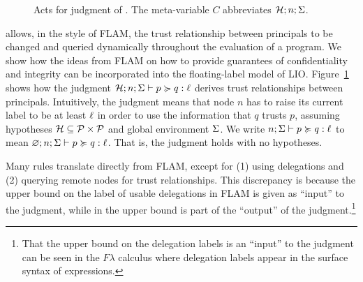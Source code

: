\begin{figure}
    \caption{Acts for judgment of \lang. The meta-variable $C$ abbreviates $\mathcal{H}; n; \Sigma$.}
    \label{fig:act-for-judgment}
\end{figure}

\lang{} allows, in the style of FLAM, the trust relationship between principals to be changed and queried dynamically throughout the evaluation of a program. We show how the ideas from FLAM on how to provide guarantees of confidentiality and integrity can be incorporated into the floating-label model of LIO. Figure~\ref{fig:act-for-judgment} shows how the judgment $\mathcal{H}; n; \Sigma \vdash p \succcurlyeq q : \ell$ derives trust relationships between principals. Intuitively, the judgment means that node $n$ has to raise its current label to be at least $\ell$ in order to use the information that $q$ trusts $p$, assuming hypotheses $\mathcal{H} \subseteq \mathcal{P} \times \mathcal{P}$ and global environment $\Sigma$. We write $n; \Sigma \vdash p \succcurlyeq q : \ell$ to mean $\varnothing; n; \Sigma \vdash p \succcurlyeq q : \ell$. That is, the judgment holds with no hypotheses.

Many rules translate directly from FLAM, except for (1) using delegations and (2) querying remote nodes for trust relationships. This discrepancy is because the upper bound on the label of usable delegations in FLAM is given as ``input'' to the judgment, while in \lang{} the upper bound is part of the ``output'' of the judgment.\footnote{That the upper bound on the delegation labels is an ``input'' to the judgment can be seen in the $F\lambda$ calculus \cite{flamtr} where delegation labels appear in the surface syntax of expressions.}

